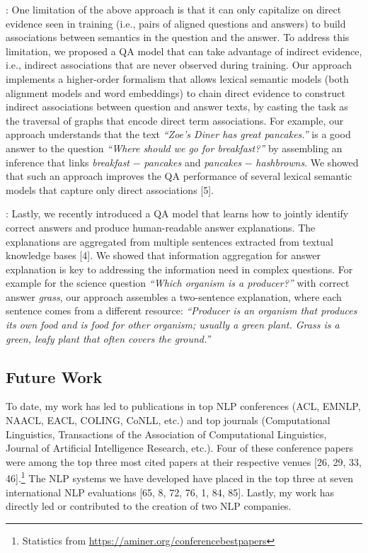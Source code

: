 \documentclass[10pt]{article}
\begin{document}
{}: One limitation of the above approach is that it can only capitalize on direct evidence seen in training (i.e., pairs of aligned questions and answers) to build associations between semantics in the question and the answer. 
To address this limitation, we proposed a QA model that can take advantage of indirect evidence, i.e., indirect associations that are never observed during training.
Our approach implements a higher-order formalism that allows lexical semantic models (both alignment models and word embeddings) to chain direct evidence to construct indirect associations between question and answer texts, by casting the task as the traversal of graphs that encode direct term associations. 
For example, our approach understands that the text {\em ``Zoe's Diner has great pancakes.''} is a good answer to the question {\em ``Where should we go for breakfast?''} by assembling an inference that links {\em breakfast} $-$ {\em pancakes} and {\em pancakes} $-$ {\em hashbrowns}.
We showed that such an approach improves the QA performance of several lexical semantic models that capture only direct associations [5].

{}: Lastly, we recently introduced a QA model that learns how to jointly identify correct answers and produce human-readable answer explanations. The explanations are aggregated from multiple sentences extracted from textual knowledge bases  [4]. We showed that information aggregation for answer explanation is key to addressing the information need in complex questions.
For example for the science question {\em ``Which organism is a producer?''} with correct answer {\em grass}, our approach assembles a two-sentence explanation, where each sentence comes from a different resource: {\em ``Producer is an organism that produces its own food and is food for other organism; usually a green plant. Grass is a green, leafy plant that often covers the ground.''}

\subsection*{Future Work}

To date, my work has %
led to publications in top NLP conferences (ACL, EMNLP, NAACL, EACL, COLING, CoNLL, etc.) and top journals (Computational Linguistics, Transactions of the Association of Computational Linguistics, Journal of Artificial Intelligence Research, etc.). Four of these conference papers were among the top three most cited papers at their respective venues [26, 29, 33, 46].\footnote{Statistics from \scriptsize \url{https://aminer.org/conferencebestpapers}} 
The NLP systems we have developed have placed in the top three at seven international NLP evaluations [65, 8, 72, 76, 1, 84, 85].
Lastly, my work has directly led or contributed to the creation of two NLP companies. 
\end{document}

